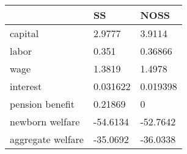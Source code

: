 \begin{tabular}{lll}
& SS & NOSS \\ 
\hline 
capital & 2.9777 & 3.9114 \\ 
labor & 0.351 & 0.36866 \\ 
wage & 1.3819 & 1.4978 \\ 
interest & 0.031622 & 0.019398 \\ 
pension benefit & 0.21869 & 0 \\ 
newborn welfare & -54.6134 & -52.7642 \\ 
aggregate welfare & -35.0692 & -36.0338 \\ 
\hline 
\end{tabular}